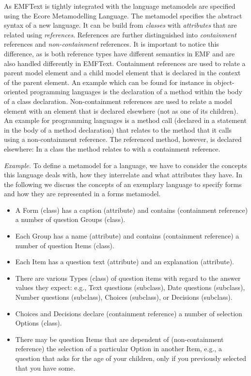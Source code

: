 	As EMFText is tightly integrated with the \EMF language metamodels are
	specified using the Ecore Metamodelling Language. The metamodel specifies the abstract
	syntax of a new language. It can be build from \emph{classes} with
	\emph{attributes} that are related using \emph{references}. References are
	further distinguished into \emph{containment} references and
	\emph{non-containment} references. It is important to notice this difference,
	as is both reference types have different semantics in EMF and are also handled
	differently in EMFText. Containment references are used to relate a parent model element and a
	child model element that is declared in the context of the parent element. An
	example which can be found for instance in object-oriented programming
	languages is the declaration of a method within the body of a class declaration. Non-containment
	references are used to relate a model element with an element that is declared
	elsewhere (not as one of its children). An example for programming languages is
	a method call (declared in a statement in the body of a method declaration) that
	relates to the method that it calls using a non-containment reference. The
	referenced method, however, is declared elsewhere: In a class the method
	relates to with a containment reference. 

		\emph{Example.} 
		To define a metamodel for a language, we have to consider the
		concepts this language deals with, how they interrelate and what attributes they
		have. In the following we discuss the concepts of an exemplary language to
		specify forms and how they are represented in a forms metamodel.
		
		\begin{itemize} 
		  \item A Form (class) has a caption (attribute) and contains (containment
		  reference) a number of question Groups (class).
		  \item Each Group has a name (attribute) and contains (containment reference)
		  a number of question Items (class).
		  \item Each Item has a question text (attribute) and an explanation
		  (attribute).
		  \item There are various Types (class) of question items  with
		  regard to the answer values they expect: e.g., Text questions
		  (subclass), Date questions  (subclass), Number questions  (subclass),
		  Choices (subclass), or Decisions (subclass).
		  \item Choices and Decisions declare (containment reference) a number of
		  selection Options (class).
		  \item There may be question Items
		  that are dependent of (non-containment reference) the selection of a 
		  particular Option in another Item, 
		  e.g., a question that asks for the age of your children, only if you
		  previously selected that you have some.
		\end{itemize}

